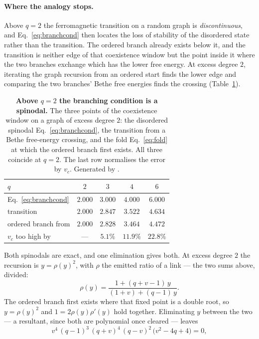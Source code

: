 \paragraph{Where the analogy stops.} Above $q=2$ the
ferromagnetic transition on a random graph is \emph{discontinuous}, and
Eq.~\eqref{eq:branchcond} then locates the loss of stability of the disordered
state rather than the transition. The ordered branch already exists below it,
and the transition is neither edge of that coexistence window but the point
inside it where the two branches exchange which has the lower free energy. At
excess degree $2$, iterating the graph recursion from an ordered start finds the
lower edge and comparing the two branches' Bethe free energies finds the
crossing (Table~\ref{tab:pottswindow}).
\begin{table}[t]
\centering\small
\begin{tabular}{lcccc}
\hline\hline
$q$ & $2$ & $3$ & $4$ & $6$\\
\hline
Eq.~\eqref{eq:branchcond} & $2.000$ & $3.000$ & $4.000$ & $6.000$\\
transition & $2.000$ & $2.847$ & $3.522$ & $4.634$\\
ordered branch from & $2.000$ & $2.828$ & $3.464$ & $4.472$\\
$v_{c}$ too high by & --- & $5.1\%$ & $11.9\%$ & $22.8\%$\\
\hline\hline
\end{tabular}
\caption{\textbf{Above $q=2$ the branching condition is a spinodal.} The three points of the coexistence window on a graph of excess degree $2$: the disordered spinodal Eq.~\eqref{eq:branchcond}, the transition from a Bethe free-energy crossing, and the fold Eq.~\eqref{eq:fold} at which the ordered branch first exists. All three coincide at $q=2$. The last row normalises the error by $v_{c}$. Generated by .}
\label{tab:pottswindow}
\end{table}
Both spinodals are exact, and one elimination gives both. At excess degree $2$
the recursion is $y=\rho(y)^{2}$, with $\rho$ the emitted ratio of a link ---
the two sums above, divided:
\[
  \rho(y)=\frac{1+(q+v-1)\,y}{(1+v)+(q-1)\,y}.
\]
The ordered branch first exists where that fixed point is a double root, so
$y=\rho(y)^{2}$ and $1=2\rho(y)\rho'(y)$ hold together. Eliminating $y$ between
the two --- a resultant, since both are polynomial once cleared --- leaves
\[
  v^{4}\,(q-1)^{3}\,(q+v)^{4}\,(q-v)^{2}\,\bigl(v^{2}-4q+4\bigr)=0,
\]
